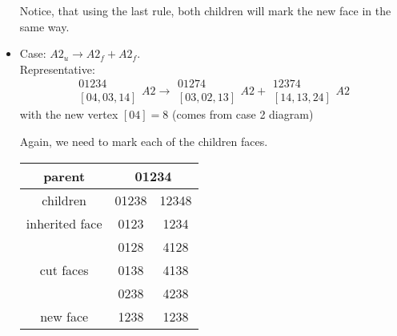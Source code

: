 \documentclass[a4paper,12pt]{amsart}
\numberwithin{equation}{section}
\begin{document}
\begin{itemize}
	Notice, that using the last rule, both children will mark the new face in the same way.
	
	\item Case: $A2_u \rightarrow A2_f + A2_f$. \\
	Representative: 
	$$ \begin{array}{c} 01234 \\ \left[04,03,14\right] \end{array} A2
	\rightarrow 
	\begin{array}{c} 01274 \\ \left[03,02,13\right] \end{array} A2 +
	\begin{array}{c} 12374 \\ \left[14,13,24\right] \end{array} A2 $$
	with the new vertex $\left[04\right] = 8$ (comes from case 2 diagram)
	
	
    Again, we need to mark each of the children faces. 

    \begin{minipage}[]{0.5\textwidth}
  \begin{center}
	
	\begin{tabular}{|c|c|c|} \hline
	parent & \multicolumn{2}{|c|}{01234} \\ \hline
	children & 01238 & 12348 \\ \hline
	inherited face & 0123 & 1234 \\ \hline
	\multirow{3}{*}{cut faces} & 0128 & 4128 \\ 
	 & 0138 & 4138 \\ 
	 & 0238 & 4238 \\ \hline
	 new face & 1238 & 1238 \\ \hline
	\end{tabular}
  \end{center}
\end{minipage}
\hfill
    \begin{minipage}[]{0.5\textwidth}
  \begin{center}
	

\end{center}
\end{minipage}
\end{itemize}
\end{document}
